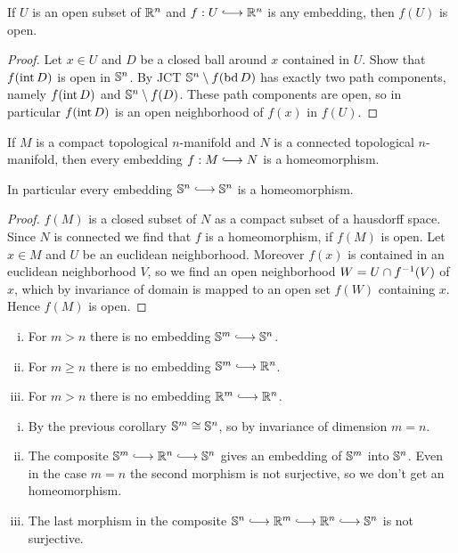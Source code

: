 	\begin{corollary}
		If $U$ is an open subset of $\R^n$ and $f: U \longrightincl \R^n$ is any embedding, then $f(U)$ is open.
	\end{corollary}
	\begin{proof}
		Let $x \in U$ and $D$ be a closed ball around $x$ contained in $U$. Show that $f(\interior D)$ is open in $\S^n$. By JCT $\S^n \setminus f(\boundary D)$ has exactly two path components, namely $f(\interior D)$ and $\S^n \setminus f(D)$. These path components are open, so in particular $f(\interior D)$ is an open neighborhood of $f(x)$ in $f(U)$.
	\end{proof}

	\begin{corollary}
		If $M$ is a compact topological $n$-manifold and $N$ is a connected topological $n$-manifold, then every embedding $f: M \longrightincl N$ is a homeomorphism.

		In particular every embedding $\S^n \longrightincl \S^n$ is a homeomorphism.
	\end{corollary}
	\begin{proof}
		$f(M)$ is a closed subset of $N$ as a compact subset of a hausdorff space. Since $N$ is connected we find that $f$ is a homeomorphism, if $f(M)$ is open. Let $x \in M$ and $U$ be an euclidean neighborhood. Moreover $f(x)$ is contained in an euclidean neighborhood $V$, so we find an open neighborhood $W = U \intersection f^{-1}(V)$ of $x$, which by invariance of domain is mapped to an open set $f(W)$ containing $x$. Hence $f(M)$ is open.
	\end{proof}

	\begin{corollary}
		\vspace{-1.5em}
		\begin{enumerate}[(i)]
			\item{
				For $m > n$ there is no embedding $\S^m \longrightincl \S^n$.
			}
			\item{
				For $m \geq n$ there is no embedding $\S^m \longrightincl \R^n$.
			}
			\item{
				For $m > n$ there is no embedding $\R^m \longrightincl \R^n$.
			}
		\end{enumerate}
	\end{corollary}
	\begin{sketch}
		\begin{enumerate}[(i)]
			\item{
				By the previous corollary $\S^m \isom \S^n$, so by invariance of dimension $m = n$.
			}
			\item{
				The composite $\S^m \longrightincl \R^n \longrightincl \S^n$ gives an embedding of $\S^m$ into $\S^n$. Even in the case $m=n$ the second morphism is not surjective, so we don't get an homeomorphism.
			}
			\item{
				The last morphism in the composite $\S^n \longrightincl \R^m \longrightincl \R^n \longrightincl \S^n$ is not surjective.
			}
			\vspace{-1.8em}
		\end{enumerate}
	\end{sketch}

